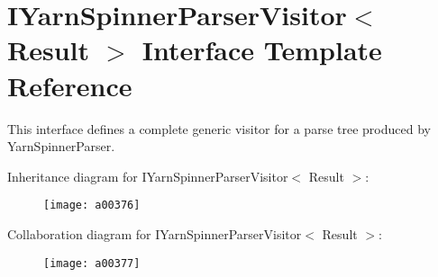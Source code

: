 \hypertarget{a00121}{\section{I\-Yarn\-Spinner\-Parser\-Visitor$<$ Result $>$ Interface Template Reference}
\label{a00121}
}


This interface defines a complete generic visitor for a parse tree produced by Yarn\-Spinner\-Parser.  




Inheritance diagram for I\-Yarn\-Spinner\-Parser\-Visitor$<$ Result $>$\-:
\nopagebreak
\begin{figure}[H]
\begin{center}
\leavevmode
\texttt{[image: a00376]}
\end{center}
\end{figure}


Collaboration diagram for I\-Yarn\-Spinner\-Parser\-Visitor$<$ Result $>$\-:
\nopagebreak
\begin{figure}[H]
\begin{center}
\leavevmode
\texttt{[image: a00377]}
\end{center}
\end{figure}

